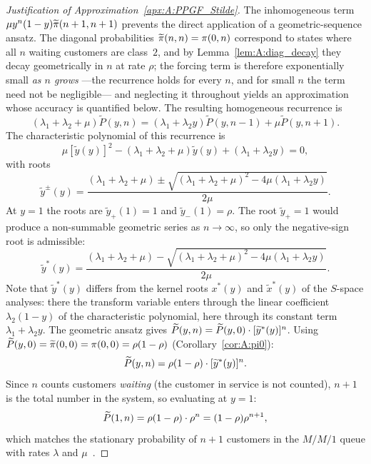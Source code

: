 \begin{proof}[Justification of Approximation~\ref{apx:A:PPGF_Stilde}]
The inhomogeneous term $\mu y^n(1-y)\widetilde{\pi}(n+1,n+1)$ prevents the direct application
of a geometric-sequence ansatz. The diagonal probabilities $\widetilde{\pi}(n,n)=\pi(0,n)$
correspond to states where all $n$ waiting customers are class~$2$, and by
Lemma~\ref{lem:A:diag_decay} they decay geometrically in $n$ at rate $\rho$; the
forcing term is therefore exponentially small \emph{as $n$ grows} ---the recurrence
holds for every $n$, and for small $n$ the term need not be negligible--- and
neglecting it throughout yields an approximation whose accuracy is quantified below.
The resulting homogeneous recurrence is
\begin{equation*}
    (\lambda_1 + \lambda_2 + \mu) \widetilde{P}(y,n) = (\lambda_1 + \lambda_2 y) \widetilde{P}(y,n-1) + \mu \widetilde{P}(y,n+1).
\end{equation*}
The characteristic polynomial of this recurrence is
\begin{equation*}
    \mu [\widetilde{y}(y)]^2 - (\lambda_1 + \lambda_2 + \mu) \widetilde{y}(y) + (\lambda_1 + \lambda_2 y) = 0,
\end{equation*}
with roots
\begin{equation*}
    \widetilde{y}^{\pm}(y) = \frac{(\lambda_1 + \lambda_2 + \mu) \pm \sqrt{(\lambda_1 + \lambda_2 + \mu)^2 - 4\mu(\lambda_1 + \lambda_2 y)}}{2\mu}.
\end{equation*}
At $y=1$ the roots are $\widetilde{y}_{+}(1)=1$ and $\widetilde{y}_{-}(1)=\rho$.
The root $\widetilde{y}_{+}=1$ would produce a non-summable geometric series as
$n\to\infty$, so only the negative-sign root is admissible:
\begin{equation*}
    \widetilde{y}^*(y) = \frac{(\lambda_1 + \lambda_2 + \mu) - \sqrt{(\lambda_1 + \lambda_2 + \mu)^2 - 4\mu(\lambda_1 + \lambda_2 y)}}{2\mu}.
\end{equation*}
Note that $\widetilde{y}^*(y)$ differs from the kernel roots $x^*(y)$ and $\widetilde{x}^*(y)$ of the $S$-space analyses: there the transform variable enters through the linear coefficient $\lambda_2(1-y)$ of the characteristic polynomial, here through its constant term $\lambda_1+\lambda_2 y$.
The geometric ansatz gives $\widetilde{P}(y,n)=\widetilde{P}(y,0) \cdot [\widetilde{y}^*(y)]^n$.
Using $\widetilde{P}(y,0)=\widetilde{\pi}(0,0)=\pi(0,0)=\rho(1-\rho)$ (Corollary~\ref{cor:A:pi0}):
\begin{equation*}
    \widetilde{P}(y,n)=\rho(1-\rho) \cdot  [\widetilde{y}^*(y)]^n.
\end{equation*}
Since $n$ counts customers \emph{waiting} (the customer in service is not counted),
$n+1$ is the total number in the system, so evaluating at $y=1$:
\begin{equation*}
    \widetilde{P}(1,n)= \rho(1-\rho) \cdot\rho^n= (1-\rho) \rho^{n+1},
\end{equation*}
which matches the stationary probability of $n+1$ customers in the $M/M/1$ queue
with rates $\lambda$ and $\mu$~\cite{adan2002queueing}.
\end{proof}

